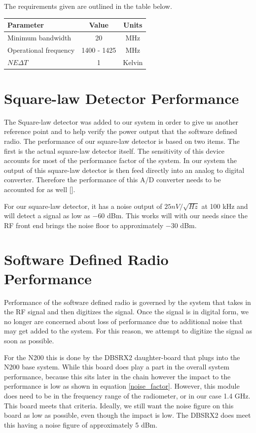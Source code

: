 The requirements given are outlined in the table below.

\begin{table}[h!tb] \centering
{}
\label{rad_performance}
\begin{tabular}{lcc} \hline
\textbf{Parameter} & \textbf{Value} & \textbf{Units} \\ \hline
Minimum bandwidth & 20 & MHz \\
Operational frequency & 1400 - 1425 & MHz \\
$NE\Delta T$ & 1 & Kelvin \\ \hline
\end{tabular}
\end{table}

\section{Square-law Detector Performance}
The Square-law detector was added to our system in order to give us another reference point and to help verify the power output that the software defined radio.  The performance of our square-law detector is based on two items.  The first is the actual square-law detector itself.  The sensitivity of this device accounts for most of the performance factor of the system.  In our system the output of this square-law detector is then feed directly into an analog to digital converter.  Therefore the performance of this A/D converter needs to be accounted for as well [\cite{Terlep}].  

For our square-law detector, it has a noise output of $25nV/ \sqrt{Hz}$ at 100 kHz and will detect a signal as low as $-60$ dBm.  This works will with our needs since the RF front end brings the noise floor to approximately $-30$ dBm.


\section{Software Defined Radio Performance}
Performance of the software defined radio is governed by the system that takes in the RF signal and then digitizes the signal.  Once the signal is in digital form, we no longer are concerned about loss of performance due to additional noise that may get added to the system.  For this reason, we attempt to digitize the signal as soon as possible.

For the N200 this is done by the DBSRX2 daughter-board that plugs into the N200 base system.  While this board does play a part in the overall system performance, because this sits later in the chain however the impact to the performance is low as shown in equation \ref{noise_factor}.  However, this module does need to be in the frequency range of the radiometer, or in our case 1.4 GHz.  This board meets that criteria.  Ideally, we still want the noise figure on this board as low as possible, even though the impact is low.  The DBSRX2 does meet this having a noise figure of approximately 5 dBm.
